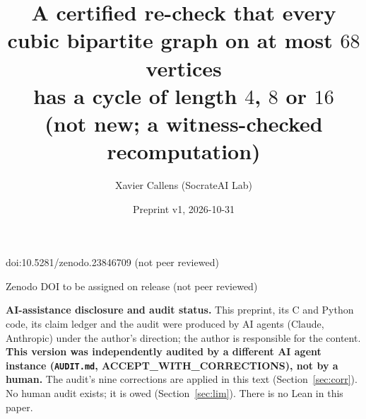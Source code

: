 \documentclass[10pt]{article}
\title{A certified re-check that every cubic bipartite graph on at most $68$ vertices\\
has a cycle of length $4$, $8$ or $16$\\
{\large (not new; a witness-checked recomputation)}}
\author{Xavier Callens (SocrateAI Lab)}
\date{Preprint v1, 2026-10-31}
\begin{document}
\maketitle
\begin{center}\small doi:10.5281/zenodo.23846709 \quad (not peer reviewed)\end{center}

\begin{center}\small Zenodo DOI to be assigned on release \quad (not peer reviewed)\end{center}

\noindent\textbf{AI-assistance disclosure and audit status.} This preprint, its C and Python code, its claim ledger and the audit were
produced by AI agents (Claude, Anthropic) under the author's direction; the author is responsible for the content.
\textbf{This version was independently audited by a different AI agent instance (\texttt{AUDIT.md}, ACCEPT\_WITH\_CORRECTIONS), not by a human.}
The audit's nine corrections are applied in this text (Section~\ref{sec:corr}). No human audit exists; it is owed (Section~\ref{sec:lim}). There is no Lean in this paper.
\end{document}
